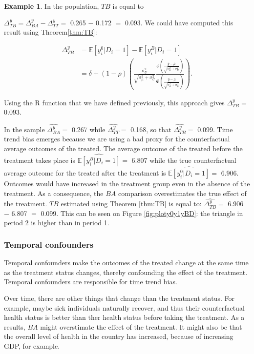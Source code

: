 \documentclass[
]{book}
\newcommand{\esp}[1]{\mathbb{E}[ #1 ]}
\theoremstyle{definition}
\theoremstyle{definition}
\newtheorem{example}{Example}[chapter]
\theoremstyle{definition}
\theoremstyle{definition}
\theoremstyle{remark}
\begin{document}
\begin{example}
\protect\hypertarget{exm:unnamed-chunk-28}{}{\label{exm:unnamed-chunk-28} }In the population, \(TB\) is equal to
\end{example}
\(\Delta^y_{TB}=\Delta^y_{BA}-\Delta^y_{TT}=\) 0.265 \(-\) 0.172 \(=\) 0.093.
We could have computed this result using Theorem\ref{thm:TB}:

\begin{align*}
\Delta^y_{TB} & = \esp{y_i^0|D_i=1}-\esp{y_i^B|D_i=1} \\
              & = \delta + (1-\rho)\left(\frac{\sigma^2_{U}}{\sqrt{\sigma^2_{\mu}+\sigma^2_{U}}}\frac{\phi\left(\frac{\bar{y}-\bar{\mu}}{\sqrt{\sigma^2_{\mu}+\sigma^2_{U}}}\right)}{\Phi\left(\frac{\bar{y}-\bar{\mu}}{\sqrt{\sigma^2_{\mu}+\sigma^2_{U}}}\right)}\right).
\end{align*}

Using the R function that we have defined previously, this approach gives \(\Delta^y_{TB}=\) 0.093.

In the sample \(\hat{\Delta^y_{BA}}=\) 0.267 while \(\hat{\Delta^y_{TT}}=\) 0.168, so that \(\hat{\Delta^y_{TB}}=\) 0.099.
Time trend bias emerges because we are using a bad proxy for the counterfactual average outcomes of the treated.
The average outcome of the treated before the treatment takes place is \(\hat{\esp{y_i^B|D_i=1}}=\) 6.807 while the true counterfactual average outcome for the treated after the treatment is \(\hat{\esp{y_i^0|D_i=1}}=\) 6.906.
Outcomes would have increased in the treatment group even in the absence of the treatment.
As a consequence, the \(BA\) comparison overestimates the true effect of the treatment.
\(TB\) estimated using Theorem \ref{thm:TB} is equal to: \(\hat{\Delta^y_{TB}}=\) 6.906 \(-\) 6.807 \(=\) 0.099.
This can be seen on Figure \ref{fig:ploty0y1yBD}: the triangle in period 2 is higher than in period 1.

\hypertarget{temporal-confounders}{%
\subsubsection{Temporal confounders}\label{temporal-confounders}}

Temporal confounders make the outcomes of the treated change at the same time as the treatment status changes, thereby confounding the effect of the treatment.
Temporal confounders are responsible for time trend bias.

Over time, there are other things that change than the treatment status.
For example, maybe sick individuals naturally recover, and thus their counterfactual health status is better than ther health status before taking the treatment.
As a results, \(BA\) might overstimate the effect of the treatment.
It might also be that the overall level of health in the country has increased, because of increasing GDP, for example.
\end{document}

